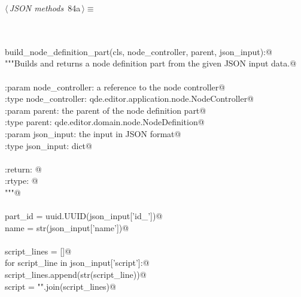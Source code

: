 \documentclass[
    a4paper,      %
    10pt,         %
    openright,    %
    notitlepage,  %
    parskip=half, %
]{scrreprt}       %
\theoremstyle{definition}                    %
\begin{document}
\begin{flushleft} \small
\begin{minipage}{\linewidth}\label{scrap134}\raggedright\small
{} $\langle\,${\itshape JSON methods}\nobreak\ {\footnotesize {84a}}$\,\rangle\equiv$
\vspace{-1exm}
\begin{list}{}{} \item
\mbox{}\lstinline@@\\
\mbox{}\lstinline@classmethod@\\
\mbox{}\lstinline@def build_node_definition_part(cls, node_controller, parent, json_input):@\\
\mbox{}\lstinline@    """Builds and returns a node definition part from the given JSON input data.@\\
\mbox{}\lstinline@@\\
\mbox{}\lstinline@    :param node_controller: a reference to the node controller@\\
\mbox{}\lstinline@    :type  node_controller: qde.editor.application.node.NodeController@\\
\mbox{}\lstinline@    :param parent: the parent of the node definition part@\\
\mbox{}\lstinline@    :type  parent: qde.editor.domain.node.NodeDefinition@\\
\mbox{}\lstinline@    :param json_input: the input in JSON format@\\
\mbox{}\lstinline@    :type  json_input: dict@\\
\mbox{}\lstinline@@\\
\mbox{}\lstinline@    :return: @\\
\mbox{}\lstinline@    :rtype:  @\\
\mbox{}\lstinline@    """@\\
\mbox{}\lstinline@@\\
\mbox{}\lstinline@    part_id         = uuid.UUID(json_input['id_'])@\\
\mbox{}\lstinline@    name            = str(json_input['name'])@\\
\mbox{}\lstinline@@\\
\mbox{}\lstinline@    script_lines = []@\\
\mbox{}\lstinline@    for script_line in json_input['script']:@\\
\mbox{}\lstinline@        script_lines.append(str(script_line))@\\
\mbox{}\lstinline@    script = "\n".join(script_lines)@\\

\end{list}
\end{minipage}
\end{flushleft}
\end{document}
